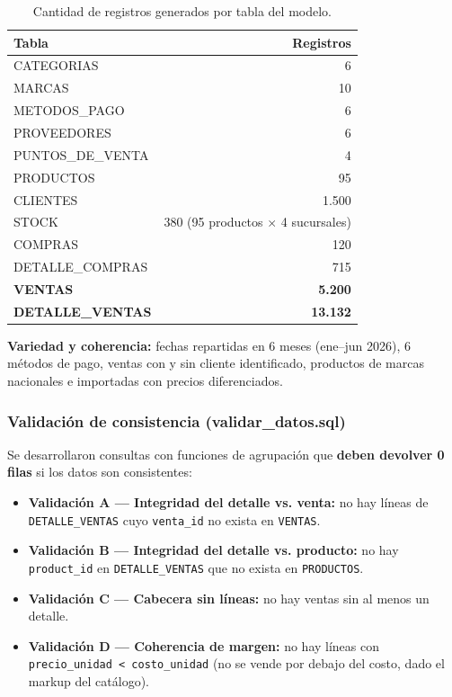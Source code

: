 \documentclass[11pt,a4paper]{article}
\begin{document}
\begin{table}[ht]
\centering
\caption{Cantidad de registros generados por tabla del modelo.}
\begin{tabular}{@{}lr@{}}
\toprule
\textbf{Tabla} & \textbf{Registros} \\
\midrule
CATEGORIAS        & 6 \\
MARCAS            & 10 \\
METODOS\_PAGO     & 6 \\
PROVEEDORES       & 6 \\
PUNTOS\_DE\_VENTA & 4 \\
PRODUCTOS         & 95 \\
CLIENTES          & 1.500 \\
STOCK             & 380 (95 productos $\times$ 4 sucursales) \\
COMPRAS           & 120 \\
DETALLE\_COMPRAS  & 715 \\
\textbf{VENTAS}          & \textbf{5.200} \\
\textbf{DETALLE\_VENTAS} & \textbf{13.132} \\
\bottomrule
\end{tabular}
\end{table}

\textbf{Variedad y coherencia:} fechas repartidas en 6 meses (ene–jun 2026), 6 métodos
de pago, ventas con y sin cliente identificado, productos de marcas nacionales e
importadas con precios diferenciados.

\subsubsection*{Validación de consistencia (validar\_datos.sql)}

Se desarrollaron consultas con funciones de agrupación que \textbf{deben devolver 0 filas}
si los datos son consistentes:

\begin{itemize}[nosep]
    \item \textbf{Validación A — Integridad del detalle vs. venta:} no hay líneas de
    \texttt{DETALLE\_VENTAS} cuyo \texttt{venta\_id} no exista en \texttt{VENTAS}.
    \item \textbf{Validación B — Integridad del detalle vs. producto:} no hay
    \texttt{product\_id} en \texttt{DETALLE\_VENTAS} que no exista en \texttt{PRODUCTOS}.
    \item \textbf{Validación C — Cabecera sin líneas:} no hay ventas sin al menos un detalle.
    \item \textbf{Validación D — Coherencia de margen:} no hay líneas con
    \texttt{precio\_unidad < costo\_unidad} (no se vende por debajo del costo, dado el
    markup del catálogo).
\end{itemize}
\end{document}
